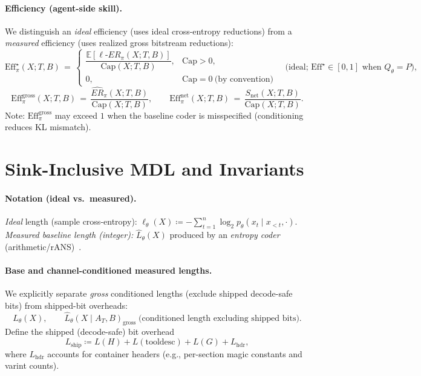 \documentclass[12pt,a4paper]{article}
\newcommand{\ERideal}{\ell\text{-}ER}
\begin{document}
\paragraph{Efficiency (agent-side skill).}
We distinguish an \emph{ideal} efficiency (uses ideal cross-entropy reductions) from a \emph{measured} efficiency (uses realized gross bitstream reductions):
\begin{equation}
\mathrm{Eff}^\star_\pi(X;T,B) \,=\, \begin{cases}
\dfrac{\mathbb{E}[\ERideal_\pi(X;T,B)]}{\mathrm{Cap}(X;T,B)}, & \mathrm{Cap}>0,\\[6pt]
0, & \mathrm{Cap}=0~\text{(by convention)}
\end{cases}\quad\text{(ideal; }\mathrm{Eff}^\star\in[0,1]\text{ when }Q_\theta=P),
\end{equation}
\begin{equation}
\mathrm{Eff}^{\mathrm{gross}}_\pi(X;T,B) \,=\, \frac{\widehat{ER}_\pi(X;T,B)}{\mathrm{Cap}(X;T,B)},\qquad
\mathrm{Eff}^{\mathrm{net}}_\pi(X;T,B) \,=\, \frac{S_{\text{net}}(X;T,B)}{\mathrm{Cap}(X;T,B)}.
\end{equation}
\noindent Note: $\mathrm{Eff}^{\mathrm{gross}}_\pi$ may exceed $1$ when the baseline coder is misspecified (conditioning reduces KL mismatch).

\section{Sink-Inclusive MDL and Invariants}
\label{sec:mdl}

\paragraph{Notation (ideal vs.\ measured).}
\emph{Ideal} length (sample cross-entropy): $\displaystyle \ell_\theta(X) \coloneqq -\sum_{t=1}^{n}\log_2 p_\theta(x_t\mid x_{<t},\cdot)$.\\
\emph{Measured baseline length (integer):} $\widehat{L}_\theta(X)$ produced by an \emph{entropy coder} (arithmetic/rANS)~\citep{witten1987arithmetic,duda2013ans}.

\paragraph{Base and channel-conditioned measured lengths.}
We explicitly separate \emph{gross} conditioned lengths (exclude shipped decode-safe bits) from shipped-bit overheads:
\begin{equation}
\widehat{L}_\theta(X),\qquad
\widehat{L}_\theta(X\mid A_T,B)_{\mathrm{gross}}\;\text{(conditioned length excluding shipped bits)}.
\end{equation}
Define the shipped (decode-safe) bit overhead
\[
L_{\mathrm{ship}} \coloneqq L(H) + L(\text{tooldesc}) + L(G) + L_{\mathrm{hdr}},
\]
where $L_{\mathrm{hdr}}$ accounts for container headers (e.g., per-section magic constants and varint counts).
\end{document}
